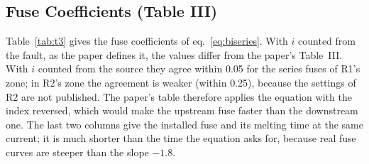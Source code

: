 \documentclass[12pt,letterpaper]{article}
\begin{document}
\subsection{Fuse Coefficients (Table III)}
Table~\ref{tab:t3} gives the fuse coefficients of eq.~\eqref{eq:biseries}. With $i$ counted from the fault,
as the paper defines it, the values differ from the paper's Table~III. With $i$ counted from the source they
agree within 0.05 for the series fuses of R1's zone; in R2's zone the agreement is weaker (within 0.25),
because the settings of R2 are not published. The paper's table therefore applies the equation with the index
reversed, which would make the upstream fuse faster than the downstream one. The last two columns give the
installed fuse and its melting time at the same current; it is much shorter than the time the equation asks
for, because real fuse curves are steeper than the slope $-1.8$.
\end{document}
